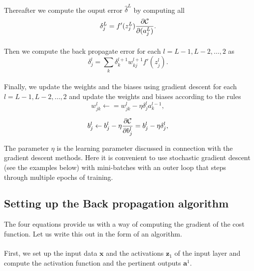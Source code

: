 \documentclass[%
oneside,                 %
final,                   %
10pt]{article}
\begin{document}
\paragraph{}
Thereafter we compute the ouput error $\hat{\delta}^L$ by computing all
\[
\delta_j^L = f'(z_j^L)\frac{\partial {\cal C}}{\partial (a_j^L)}.
\]




\paragraph{}
Then we compute the back propagate error for each $l=L-1,L-2,\dots,2$ as
\[
\delta_j^l = \sum_k \delta_k^{l+1}w_{kj}^{l+1}f'(z_j^l).
\]




\paragraph{}
Finally, we update the weights and the biases using gradient descent for each $l=L-1,L-2,\dots,2$ and update the weights and biases according to the rules
\[
w_{jk}^l\leftarrow  = w_{jk}^l- \eta \delta_j^la_k^{l-1},
\]

\[
b_j^l \leftarrow b_j^l-\eta \frac{\partial {\cal C}}{\partial b_j^l}=b_j^l-\eta \delta_j^l,
\]



The parameter $\eta$ is the learning parameter discussed in connection with the gradient descent methods.
Here it is convenient to use stochastic gradient descent (see the examples below) with mini-batches with an outer loop that steps through multiple epochs of training.

\subsection{Setting up the Back propagation algorithm}

The four equations provide us with a way of computing the gradient of the cost function. Let us write this out in the form of an algorithm.


\paragraph{}
First, we set up the input data $\bm{x}$ and the activations
$\bm{z}_1$ of the input layer and compute the activation function and
the pertinent outputs $\bm{a}^1$.
\end{document}
